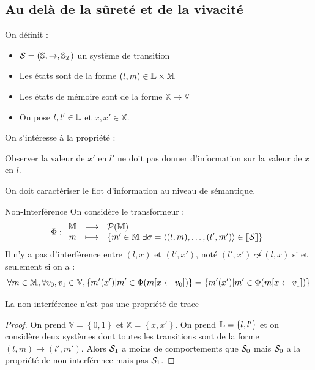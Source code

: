 \documentclass{cours}
\begin{document}
\subsection{Au delà de la sûreté et de la vivacité}
On définit :
\begin{itemize}
	\item $\mathcal{S} = \left(\mathbb{S}, \rightarrow, \mathbb{S}_{\mathcal{I}}\right)$ un système de transition
	\item Les états sont de la forme $\left(l, m\right) \in \mathbb{L} \times \mathbb{M}$
	\item Les états de mémoire sont de la forme $\mathbb{X} \rightarrow \mathbb{V}$
	\item On pose $l, l' \in \mathbb{L}$ et $x, x' \in \mathbb{X}$.
\end{itemize}
On s'intéresse à la propriété :
\begin{center}
	Observer la valeur de $x'$ en $l'$ ne doit pas donner d'information sur la valeur de $x$ en $l$.
\end{center}
On doit caractériser le flot d'information au niveau de sémantique.
\begin{définition}{Non-Interférence}{}
On considère le transformeur :
\[
	\Phi : \begin{array}{rcl}
		\mathbb{M} & \longrightarrow & \mathcal{P}(\mathbb{M})                                                                                            \\
		m  & \longmapsto     & \left\{m' \in \mathbb{M} \middle| \exists \sigma = \left\langle (l, m), \ldots, (l', m') \right\rangle \in \left\llbracket \mathcal{S} \right\rrbracket\right\}
	\end{array}
\]
Il n'y a pas d'interférence entre $(l, x)$ et $(l', x')$, noté $(l',x') \not\leadsto (l, x)$ si et seulement si on a :
\[
	\forall m \in \mathbb{M}, \forall v_{0}, v_{1} \in \mathbb{V}, \left\{m'(x')\middle| m' \in \Phi(m[x \gets v_{0}])\right\} = \left\{m'(x')\middle| m'\in \Phi(m[x \gets v_{1}])\right\}
\]
\end{définition}
\begin{propositionfr}{}{}
	La non-interférence n'est pas une propriété de trace
\end{propositionfr}
\begin{proof}
	On prend $\mathbb{V} = \left\{0, 1\right\}$ et $\mathbb{X} = \left\{x, x'\right\}$. On prend $\mathbb{L} = \{l, l'\}$ et on considère deux systèmes dont toutes les transitions sont de la forme $(l,m) \to (l', m')$.  Alors $\mathcal{S}_{1}$ a moins de comportements que $\mathcal{S}_{0}$ mais $\mathcal{S}_{0}$ a la propriété de non-interférence mais pas $\mathcal{S}_{1}$.
\end{proof}
\end{document}
